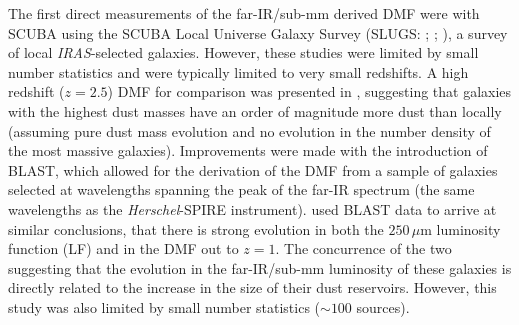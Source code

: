 
The first direct measurements of the far-IR/sub-mm derived DMF were with SCUBA using the SCUBA Local Universe Galaxy Survey (SLUGS: \citealt{Dunne_2000}; \citealt{Dunne_2001}; \citealt{Vlahakis_2005}), a survey of local \textit{IRAS}-selected galaxies. However, these studies were limited by small number statistics and were typically limited to very small redshifts. A high redshift ($z = 2.5$) DMF for comparison was presented in \citealt{Dunne_2003}, suggesting that galaxies with the highest dust masses have an order of magnitude more dust than locally (assuming pure dust mass evolution and no evolution in the number density of the most massive galaxies). Improvements were made with the introduction of BLAST, which allowed for the derivation of the DMF from a sample of galaxies selected at wavelengths spanning the peak of the far-IR spectrum (the same wavelengths as the \textit{Herschel}-SPIRE instrument). \citealt{Eales_2009} used BLAST data to arrive at similar conclusions, that there is strong evolution in both the $250\,\mu$m luminosity function (LF) and in the DMF out to $z = 1$. The concurrence of the two suggesting that the evolution in the far-IR/sub-mm luminosity of these galaxies is directly related to the increase in the size of their dust reservoirs. However, this study was also limited by small number statistics ($\sim 100$ sources).

